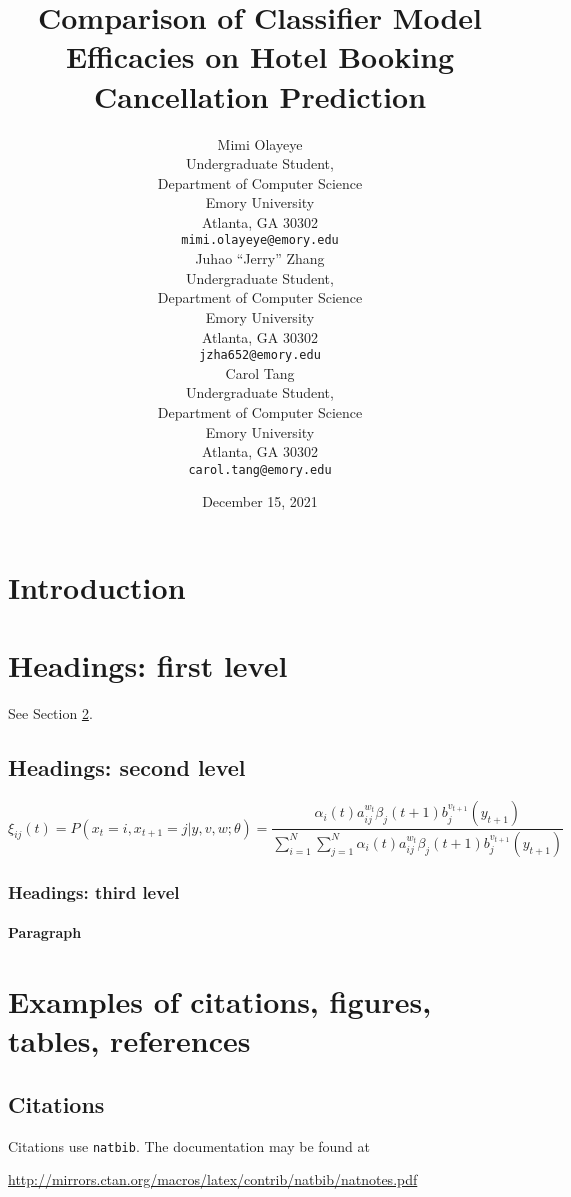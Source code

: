 \documentclass{article}
\title{Comparison of Classifier Model Efficacies on Hotel Booking Cancellation Prediction}
\date{December 15, 2021}
\author{ {\hspace{1mm}Mimi Olayeye}\\
	Undergraduate Student,\\
	Department of Computer Science\\
	Emory University\\
	Atlanta, GA 30302 \\
	\texttt{mimi.olayeye@emory.edu} \\
	\And
	{\hspace{1mm}Juhao ``Jerry'' Zhang} \\
	Undergraduate Student,\\
	Department of Computer Science\\
	Emory University\\
	Atlanta, GA 30302 \\
	\texttt{jzha652@emory.edu} \\
	\And
	{\hspace{1mm}Carol Tang} \\
	Undergraduate Student,\\
	Department of Computer Science\\
	Emory University\\
	Atlanta, GA 30302 \\
	\texttt{carol.tang@emory.edu} \\
}
\begin{document}
	\maketitle
	
	\begin{abstract}
		\lipsum[1]
	\end{abstract}
	
	
	\section{Introduction}
	\lipsum[2]
	\lipsum[3]
	
	
	\section{Headings: first level}
	\label{sec:headings}
	
	\lipsum[4] See Section \ref{sec:headings}.
	
	\subsection{Headings: second level}
	\lipsum[5]
	\begin{equation}
		\xi _{ij}(t)=P(x_{t}=i,x_{t+1}=j|y,v,w;\theta)= {\frac {\alpha _{i}(t)a^{w_t}_{ij}\beta _{j}(t+1)b^{v_{t+1}}_{j}(y_{t+1})}{\sum _{i=1}^{N} \sum _{j=1}^{N} \alpha _{i}(t)a^{w_t}_{ij}\beta _{j}(t+1)b^{v_{t+1}}_{j}(y_{t+1})}}
	\end{equation}
	
	\subsubsection{Headings: third level}
	\lipsum[6]
	
	\paragraph{Paragraph}
	\lipsum[7]
	
	\section{Examples of citations, figures, tables, references}
	\label{sec:others}
	
	\subsection{Citations}
	Citations use \verb+natbib+. The documentation may be found at
	\begin{center}
		\url{http://mirrors.ctan.org/macros/latex/contrib/natbib/natnotes.pdf}
	\end{center}
	
\end{document}
